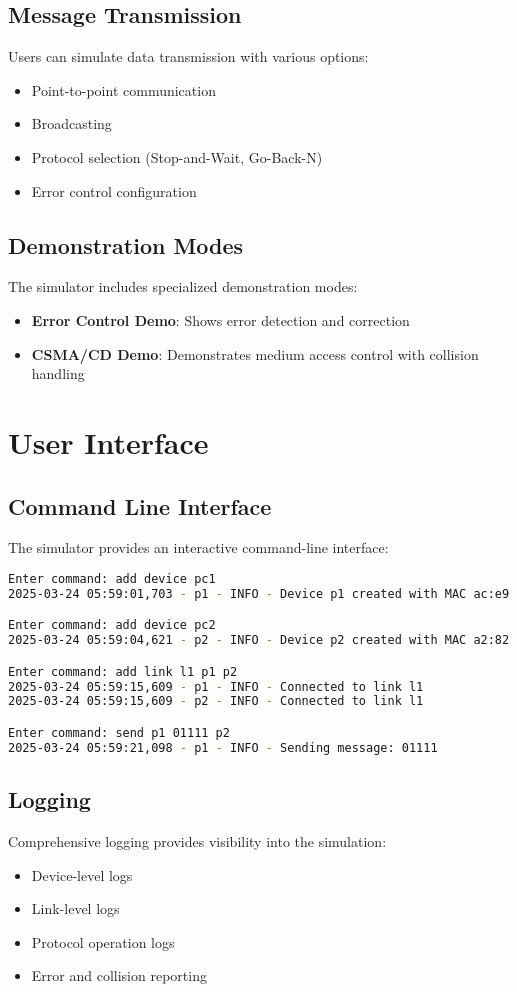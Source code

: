 \documentclass[12pt,a4paper]{article}
\begin{document}
\subsection{Message Transmission}
Users can simulate data transmission with various options:
\begin{itemize}
    \item Point-to-point communication
    \item Broadcasting
    \item Protocol selection (Stop-and-Wait, Go-Back-N)
    \item Error control configuration
\end{itemize}

\subsection{Demonstration Modes}
The simulator includes specialized demonstration modes:
\begin{itemize}
    \item \textbf{Error Control Demo}: Shows error detection and correction
    \item \textbf{CSMA/CD Demo}: Demonstrates medium access control with collision handling
\end{itemize}

\section{User Interface}
\subsection{Command Line Interface}
The simulator provides an interactive command-line interface:
\begin{lstlisting}[language=bash, caption=CLI Example]
Enter command: add device pc1
2025-03-24 05:59:01,703 - p1 - INFO - Device p1 created with MAC ac:e9:68:a7:63:f1

Enter command: add device pc2
2025-03-24 05:59:04,621 - p2 - INFO - Device p2 created with MAC a2:82:e4:57:8c:a1

Enter command: add link l1 p1 p2
2025-03-24 05:59:15,609 - p1 - INFO - Connected to link l1
2025-03-24 05:59:15,609 - p2 - INFO - Connected to link l1

Enter command: send p1 01111 p2
2025-03-24 05:59:21,098 - p1 - INFO - Sending message: 01111
\end{lstlisting}

\subsection{Logging}
Comprehensive logging provides visibility into the simulation:
\begin{itemize}
    \item Device-level logs
    \item Link-level logs
    \item Protocol operation logs
    \item Error and collision reporting
\end{itemize}
\end{document}
